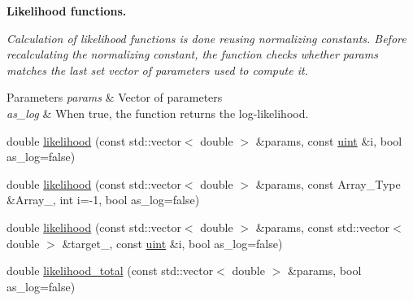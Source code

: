 \begin{Indent}\textbf{ Likelihood functions.}\par
{\em Calculation of likelihood functions is done reusing normalizing constants. Before recalculating the normalizing constant, the function checks whether {\ttfamily params} matches the last set vector of parameters used to compute it.


\begin{DoxyParams}{Parameters}
{\em params} & Vector of parameters \\
\hline
{\em as\+\_\+log} & When {\ttfamily true}, the function returns the log-\/likelihood. \\
\hline
\end{DoxyParams}
}\begin{DoxyCompactItemize}
\item 
double \hyperlink{classbarry_1_1_model_ae75fe2213980b6b245e279c7836ab99b}{likelihood} (const std\+::vector$<$ double $>$ \&params, const \hyperlink{namespacebarry_a11dfc53ddb4672278319aa04f1e09a6c}{uint} \&i, bool as\+\_\+log=false)
\item 
double \hyperlink{classbarry_1_1_model_a147586ed14d850ebab2615c60aa29b80}{likelihood} (const std\+::vector$<$ double $>$ \&params, const Array\+\_\+\+Type \&Array\+\_\+, int i=-\/1, bool as\+\_\+log=false)
\item 
double \hyperlink{classbarry_1_1_model_ab88f541fc010f0ee1a415c9cb6c292b7}{likelihood} (const std\+::vector$<$ double $>$ \&params, const std\+::vector$<$ double $>$ \&target\+\_\+, const \hyperlink{namespacebarry_a11dfc53ddb4672278319aa04f1e09a6c}{uint} \&i, bool as\+\_\+log=false)
\item 
double \hyperlink{classbarry_1_1_model_a31d16ef478d772cedde0813575074a0f}{likelihood\+\_\+total} (const std\+::vector$<$ double $>$ \&params, bool as\+\_\+log=false)
\end{DoxyCompactItemize}
\end{Indent}
